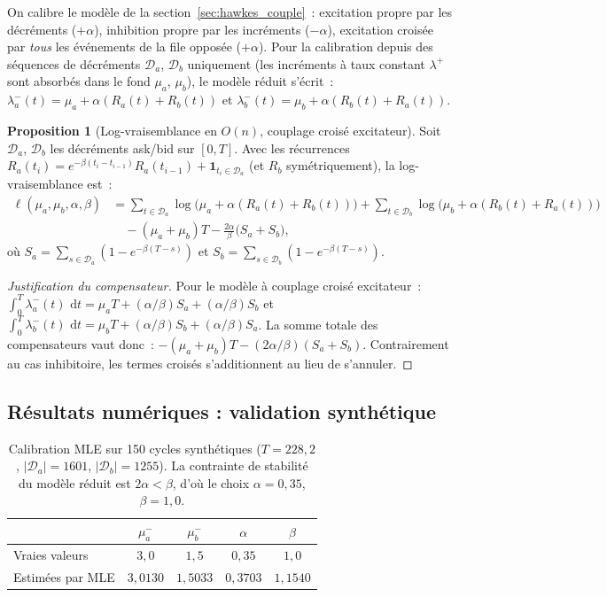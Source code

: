 \documentclass[11pt,a4paper]{article}
\theoremstyle{definition}
\newtheorem{proposition}{Proposition}[section]
\newcommand{\dif}{\,\mathrm{d}}
\newcommand{\la}{\lambda_a^-}
\newcommand{\lb}{\lambda_b^-}
\newcommand{\Ra}{R_a}
\newcommand{\Rb}{R_b}
\begin{document}
On calibre le modèle de la section~\ref{sec:hawkes_couple}~: excitation propre
par les décréments ($+\alpha$), inhibition propre par les incréments ($-\alpha$),
excitation croisée par \emph{tous} les événements de la file opposée ($+\alpha$).
Pour la calibration depuis des séquences de décréments $\mathcal{D}_a$, $\mathcal{D}_b$
uniquement (les incréments à taux constant $\lambda^+$ sont absorbés dans le
fond $\mu_a$, $\mu_b$), le modèle réduit s'écrit~:
$\la(t)=\mu_a+\alpha(\Ra(t)+\Rb(t))$ et $\lb(t)=\mu_b+\alpha(\Rb(t)+\Ra(t))$.

\begin{proposition}[Log-vraisemblance en $O(n)$, couplage croisé excitateur]
\label{prop:mle}
Soit $\mathcal{D}_a$, $\mathcal{D}_b$ les décréments ask/bid sur $[0,T]$.
Avec les récurrences $\Ra(t_i)=e^{-\beta(t_i-t_{i-1})}\Ra(t_{i-1})+\mathbf{1}_{t_i\in\mathcal{D}_a}$
(et $\Rb$ symétriquement), la log-vraisemblance est~:
\begin{align*}
  \ell(\mu_a,\mu_b,\alpha,\beta)
  &= \sum_{t\in\mathcal{D}_a}\!\log\bigl(\mu_a+\alpha(\Ra(t)+\Rb(t))\bigr)
   + \sum_{t\in\mathcal{D}_b}\!\log\bigl(\mu_b+\alpha(\Rb(t)+\Ra(t))\bigr)\\
  &\quad - (\mu_a+\mu_b)T
   - \frac{2\alpha}{\beta}\bigl(S_a+S_b\bigr),
\end{align*}
où $S_a = \sum_{s\in\mathcal{D}_a}(1-e^{-\beta(T-s)})$ et
$S_b = \sum_{s\in\mathcal{D}_b}(1-e^{-\beta(T-s)})$.
\end{proposition}

\begin{proof}[Justification du compensateur]
Pour le modèle à couplage croisé excitateur~:
$\int_0^T\!\la(t)\,\dif t = \mu_a T + (\alpha/\beta)S_a + (\alpha/\beta)S_b$
et $\int_0^T\!\lb(t)\,\dif t = \mu_b T + (\alpha/\beta)S_b + (\alpha/\beta)S_a$.
La somme totale des compensateurs vaut donc~:
$-(\mu_a+\mu_b)T - (2\alpha/\beta)(S_a+S_b)$.
Contrairement au cas inhibitoire, les termes croisés s'additionnent
au lieu de s'annuler.
\end{proof}

\subsection{Résultats numériques : validation synthétique}

\begin{table}[H]
\centering\small
\begin{tabular}{@{}lcccc@{}}
\toprule
& $\mu_a^-$ & $\mu_b^-$ & $\alpha$ & $\beta$ \\
\midrule
Vraies valeurs   & $3{,}0$ & $1{,}5$ & $0{,}35$ & $1{,}0$ \\
Estimées par MLE & $3{,}0130$ & $1{,}5033$ & $0{,}3703$ & $1{,}1540$ \\
\bottomrule
\end{tabular}
\caption{Calibration MLE sur 150 cycles synthétiques ($T=228{,}2$, $|\mathcal{D}_a|=1601$, $|\mathcal{D}_b|=1255$). La contrainte de stabilité du modèle réduit est $2\alpha<\beta$, d'où le choix $\alpha=0{,}35$, $\beta=1{,}0$.}
\label{tab:mle}
\end{table}
\end{document}
